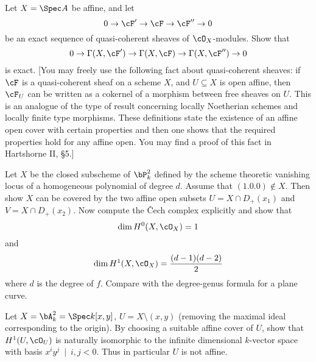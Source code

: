 \begin{homework}[e]
	 Let $X = \Spec A$ be affine, and let
	\[
	0 \to \cF' \to \cF \to \cF'' \to 0
	\]
	be an exact sequence of quasi-coherent sheaves of $\cO_X$-modules. Show that
	\[
	0 \to \Gamma(X,\cF') \to \Gamma(X,\cF) \to \Gamma(X,\cF'') \to 0
	\] 
	is exact. [You may freely use the following fact about quasi-coherent sheaves: if $\cF$ is a quasi-coherent sheaf on a scheme $X$, and $U \subseteq X$ is open affine, then $\cF_U$ can be written as a cokernel of a morphism between free sheaves on $U$. This is an analogue of the type of result concerning locally Noetherian schemes and locally finite type morphisms. These definitions state the existence of an affine open cover with certain properties and then one shows that the required properties hold for any affine open. You may find a proof of this fact in Hartshorne II, \S 5.]

	\prob Let $X$ be the closed subscheme of $\bP^2_k$ defined by the scheme theoretic vanishing locus of a homogeneous polynomial of degree $d$. Assume that $(1.0.0) \not\in X$. Then show $X$ can be covered by the two affine open subsets $U = X \cap D_+(x_1)$ and $V = X\cap D_+(x_2)$. Now compute the \v{C}ech complex explicitly and show that
	\[
	\dim H^{0}(X,\cO_X) = 1
	\] 
	and
	\[
	\dim H^{1}(X,\cO_X) = \frac{(d - 1)(d - 2)}{2}
	\]
	where $d$ is the degree of $f$. Compare with the degree-genus formula for a plane curve.

	\prob Let $X = \bA^{2}_k = \Spec k[x,y]$, $U = X \setminus {(x,y)}$ (removing the maximal ideal corresponding to the origin). By choosing a suitable affine cover of $U$, show that $H^{1}(U,\cO_U)$ is naturally isomorphic to the infinite dimensional $k$-vector space with basis ${x^iy^j ~ \mid~ i, j < 0}$. Thus in particular $U$ is not affine.
\end{homework}
\newpage


